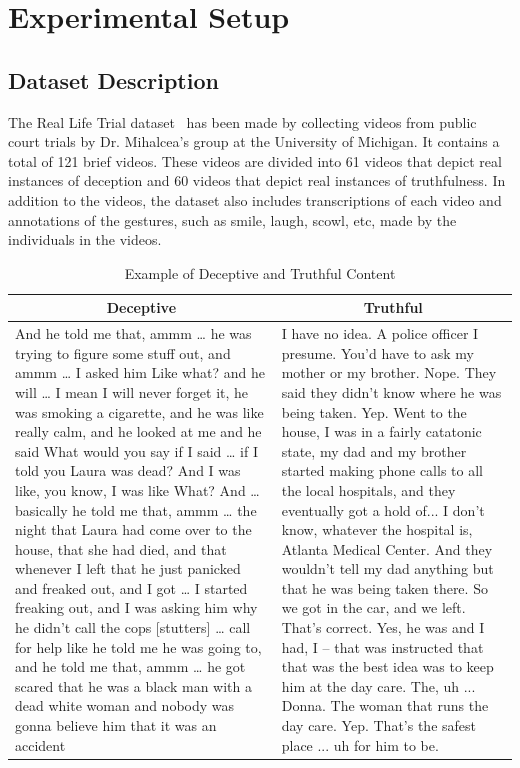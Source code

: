 \documentclass[12pt]{article}
\begin{document}
\section{Experimental Setup}
\label{sec:experimentalsetup}


\subsection{Dataset Description}
\label{sec:dataset}

The Real Life Trial dataset~\cite{csen2020multimodal} has been made by collecting videos from public court trials by Dr. Mihalcea's group at the University of Michigan. It contains a total of 121 brief videos. These videos are divided into 61 videos that depict real instances of deception and 60 videos that depict real instances of truthfulness. In addition to the videos, the dataset also includes transcriptions of each video and annotations of the gestures, such as smile, laugh, scowl, etc, made by the individuals in the videos.


\begin{table}[H]
    \centering
    \begin{tabular}{|p{8cm} p{8cm}|}
        \hline
        \multicolumn{1}{|c}{\textbf{Deceptive}} & \multicolumn{1}{c|}{\textbf{Truthful}} \\
        \hline
And he told me that, ammm … he was trying to figure some stuff out, and ammm … I asked him Like what? and he will … I mean I will never forget it, he was smoking a cigarette, and he was like really calm, and he looked at me and he said What would you say if I said … if I told you Laura was dead? And I was like, you know, I was like What? And … basically he told me that, ammm … the night that Laura had come over to the house, that she had died, and that whenever I left that he just panicked and freaked out, and I got … I started freaking out, and I was asking him why he didn't call the cops [stutters] … call for help like he told me he was going to, and he told me that, ammm … he got scared that he was a black man with a dead white woman and nobody was gonna believe him that it was an accident & I have no idea. A police officer I presume. You'd have to ask my mother or my brother. Nope. They said they didn't know where he was being taken. Yep. Went to the house, I was in a fairly catatonic state, my dad and my brother started making phone calls to all the local hospitals, and they eventually got a hold of... I don't know, whatever the hospital is, Atlanta Medical Center. And they wouldn't tell my dad anything but that he was being taken there. So we got in the car, and we left. That's correct. Yes, he was and I had, I -- that was instructed that that was the best idea was to keep him at the day care. The, uh ... Donna. The woman that runs the day care. Yep. That's the safest place ... uh for him to be. \\
        
        \hline
    \end{tabular}
    \caption{Example of Deceptive and Truthful Content}
\end{table}
\end{document}
